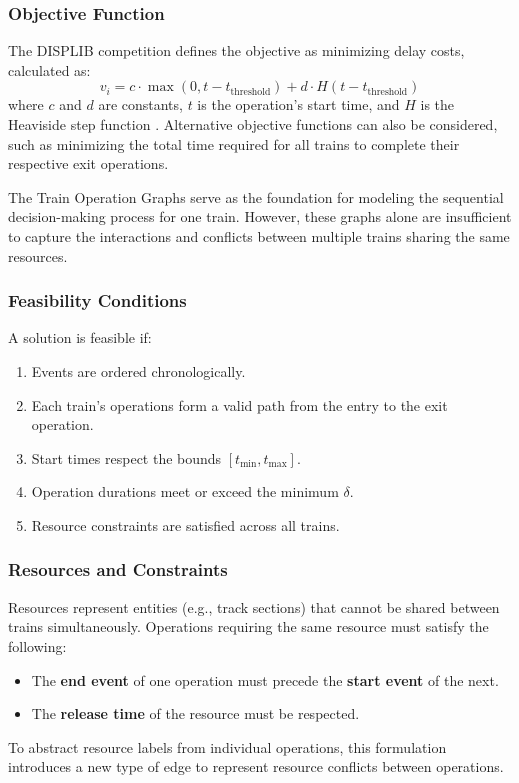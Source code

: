 \documentclass[runningheads]{llncs}
\begin{document}
\subsubsection{Objective Function}
The DISPLIB competition defines the objective as minimizing delay costs, calculated as:
\[
v_i = c \cdot \max(0, t - t_{\text{threshold}}) + d \cdot H(t - t_{\text{threshold}})
\]
where $c$ and $d$ are constants, $t$ is the operation's start time, and $H$ is the Heaviside step function \cite{train:DISPLIB2025}.
Alternative objective functions can also be considered, such as minimizing the total time required for all trains to complete their respective exit operations.

The Train Operation Graphs serve as the foundation for modeling the sequential decision-making process for one train.
However, these graphs alone are insufficient to capture the interactions and conflicts between multiple trains sharing the same resources. 


\subsubsection{Feasibility Conditions}
A solution is feasible if:
\begin{enumerate}
    \item Events are ordered chronologically.
    \item Each train's operations form a valid path from the entry to the exit operation.
    \item Start times respect the bounds $[t_{\text{min}}, t_{\text{max}}]$.
    \item Operation durations meet or exceed the minimum $\delta$.
    \item Resource constraints are satisfied across all trains.
\end{enumerate}


\subsubsection{Resources and Constraints}
Resources represent entities (e.g., track sections) that cannot be shared between trains simultaneously. 
Operations requiring the same resource must satisfy the following:
\begin{itemize}
    \item The \textbf{end event} of one operation must precede the \textbf{start event} of the next.
    \item The \textbf{release time} of the resource must be respected.
\end{itemize}
To abstract resource labels from individual operations, this formulation introduces a new type of edge to represent resource conflicts between operations. 
\end{document}
